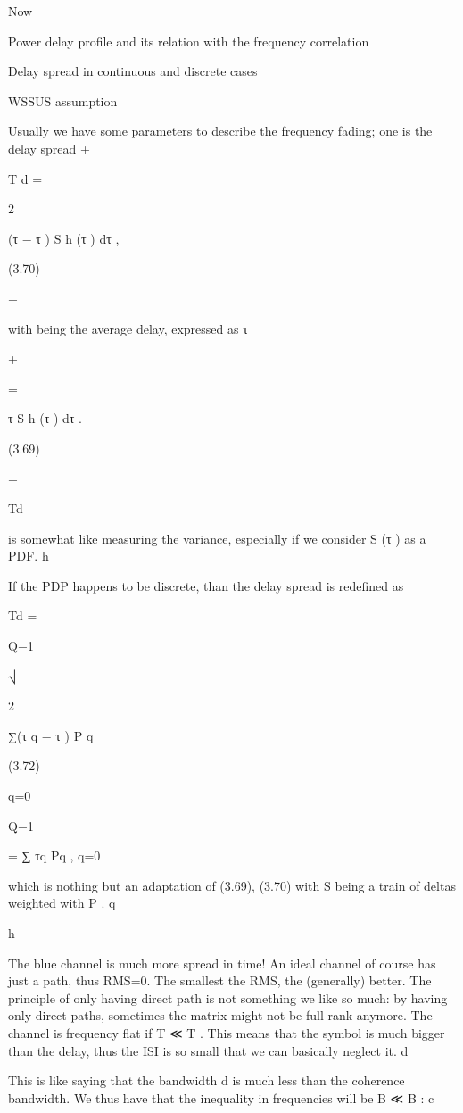 {{{{Now

Power delay profile and its relation with the frequency correlation

Delay spread in continuous and discrete cases

WSSUS assumption

Usually we have some parameters to describe the frequency fading; one is the delay spread
+\infty

T d = \sqrt\int

2

(τ − \mu τ ) S h (τ ) dτ ,

(3.70)

−\infty

with \mu being the average delay, expressed as τ

+\infty

 = \int

τ S h (τ ) dτ .

(3.69)

−\infty

Td

is somewhat like measuring the variance, especially if we consider S (τ ) as a PDF.
h

If the PDP happens to be discrete, than the delay spread is redefined as


Td =

Q−1

⎷

2

∑(τ q − \mu τ ) P q

(3.72)

q=0

Q−1

 = ∑ τq Pq ,
q=0

which is nothing but an adaptation of (3.69), (3.70) with S being a train of deltas weighted with P .
q

h

The blue channel is much more spread in time!
An ideal channel of course has just a path, thus RMS=0.
The smallest the RMS, the (generally) better. The principle of only having direct path is not something we like so much: by having only direct paths, sometimes the matrix might not be full rank anymore.
The channel is frequency flat if T ≪ T . This means that the symbol is much bigger than the delay, thus the ISI is so small that we can basically neglect it.
d

This is like saying that the bandwidth d is much less than the coherence bandwidth.
We thus have that the inequality in frequencies will be B ≪ B :
c

}}}}
